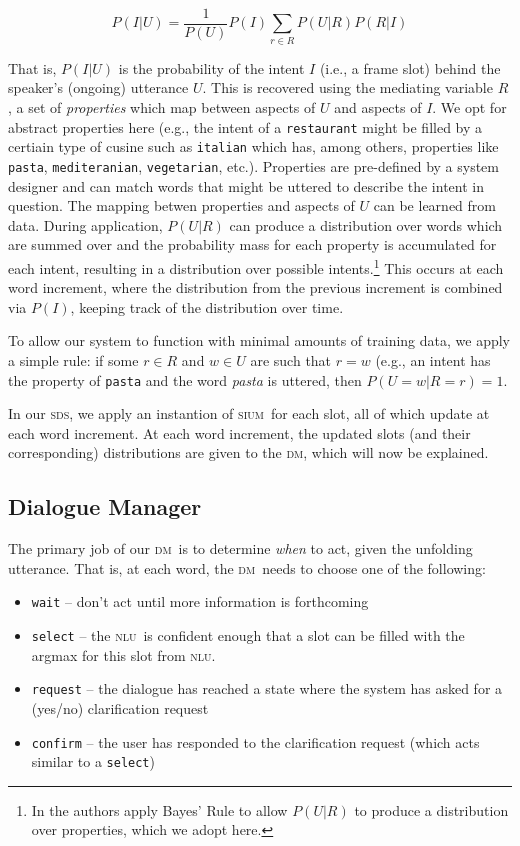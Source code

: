 \documentclass[11pt]{article}
\newcommand{\sds}[0]{\textsc{sds}}
\newcommand{\nlu}[0]{\textsc{nlu}}
\newcommand{\sium}[0]{\textsc{sium}}
\newcommand{\dm}[0]{\textsc{dm}}
\begin{document}
\begin{center}
\begin{equation}
   P(I|U) = \frac{1}{P(U)} P(I)\sum_{r\in R} P(U|R)P(R|I) 
\label{eq:disc1}
\end{equation}
\end{center}

That is, $P(I|U)$ is the probability of the intent $I$ (i.e., a frame slot) behind the speaker's (ongoing) utterance $U$. This is recovered using the mediating variable $R$, a set of \emph{properties} which map between aspects of $U$ and aspects of $I$. We opt for abstract properties here (e.g., the intent of a \texttt{restaurant} might be filled by a certiain type of cusine such as \texttt{italian} which has, among others, properties like \texttt{pasta}, \texttt{mediteranian}, \texttt{vegetarian}, etc.). Properties are pre-defined by a system designer and can match words that might be uttered to describe the intent in question. The mapping betwen properties and aspects of $U$ can be learned from data. During application, $P(U|R)$ can produce a distribution over words which are summed over and the probability mass for each property is accumulated for each intent, resulting in a distribution over possible intents.\footnote{In  the authors apply Bayes' Rule to allow $P(U|R)$ to produce a distribution over properties, which we adopt here.} This occurs at each word increment, where the distribution from the previous increment is combined via $P(I)$, keeping track of the distribution over time. 

To allow our system to function with minimal amounts of training data, we apply a simple rule: if some $r \in R$ and $w \in U$ are such that $r=w$ (e.g., an intent has the property of \texttt{pasta} and the word \emph{pasta} is uttered, then $P(U=w|R=r) = 1$.

In our \sds, we apply an instantion of \sium\ for each slot, all of which update at each word increment. At each word increment, the updated slots (and their corresponding) distributions are given to the \dm, which will now be explained. 

\subsection{Dialogue Manager}

The primary job of our \dm\ is to determine \emph{when} to act, given the unfolding utterance. That is, at each word, the \dm\ needs to choose one of the following:
\begin{itemize}
 \item \texttt{wait} -- don't act until more information is forthcoming
 \item \texttt{select} -- the \nlu\ is confident enough that a slot can be filled with the argmax for this slot from \nlu.
 \item \texttt{request} -- the dialogue has reached a state where the system has asked for a (yes/no) clarification request
 \item \texttt{confirm} -- the user has responded to the clarification request (which acts similar to a \texttt{select})
\end{itemize}
\end{document}
